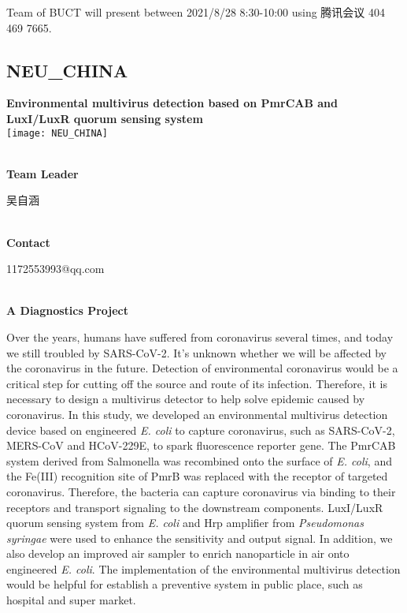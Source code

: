 \vfill{}









Team of BUCT will present between    2021/8/28 8:30-10:00     using 腾讯会议 404 469 7665.
\newpage


\subsection{\textcolor{Blu}{ NEU\_CHINA } }
\vspace{5mm}
\begin{center}
\large{
  \textbf{ Environmental multivirus detection based on PmrCAB and LuxI/LuxR quorum sensing system }\\

  \texttt{[image: NEU\_CHINA]}
}
\end{center}
\textbf{\\Team Leader}

  吴自涵


\textbf{\\Contact}

  1172553993@qq.com


\textbf{\\A Diagnostics Project\\}\begin{spacing}{1.5}

Over the years, humans have suffered from coronavirus several times, and today we still troubled by SARS-CoV-2. It's unknown whether we will be affected by the coronavirus in the future. Detection of environmental coronavirus would be a critical step for cutting off the source and route of its infection. Therefore, it is necessary to design a multivirus detector to help solve epidemic caused by coronavirus. In this study, we developed an environmental multivirus detection device based on engineered \textit{E. coli} to capture coronavirus, such as SARS-CoV-2, MERS-CoV and HCoV-229E, to spark fluorescence reporter gene. The PmrCAB system derived from Salmonella was recombined onto the surface of \textit{E. coli}, and the Fe(III) recognition site of PmrB was replaced with the receptor of targeted coronavirus. Therefore, the bacteria can capture coronavirus via binding to their receptors and transport signaling to the downstream components. LuxI/LuxR quorum sensing system from \textit{E. coli} and Hrp amplifier from \textit{Pseudomonas syringae} were used to enhance the sensitivity and output signal. In addition, we also develop an improved air sampler to enrich nanoparticle in air onto engineered \textit{E. coli}. The implementation of the environmental multivirus detection would be helpful for establish a preventive system in public place, such as hospital and super market.\end{spacing}
\\

